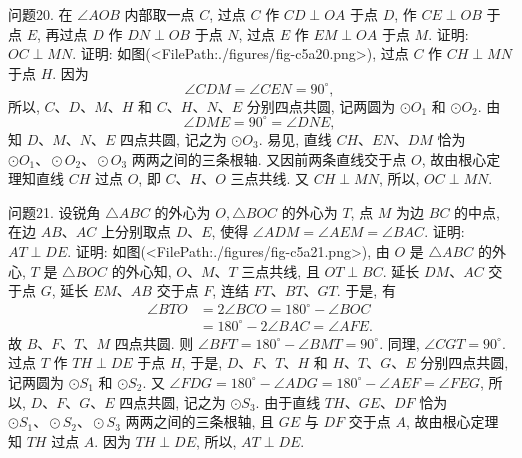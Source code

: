 问题20. 在 $\angle A O B$ 内部取一点 $C$, 过点 $C$ 作 $C D \perp O A$ 于点 $D$, 作 $C E \perp O B$ 于点 $E$, 再过点 $D$ 作 $D N \perp O B$ 于点 $N$, 过点 $E$ 作 $E M \perp O A$ 于点 $M$. 证明: $O C \perp M N$.
证明: 如图(<FilePath:./figures/fig-c5a20.png>), 过点 $C$ 作 $C H \perp M N$ 于点 $H$.
因为
$$
\angle C D M=\angle C E N=90^{\circ},
$$
所以, $C 、 D 、 M 、 H$ 和 $C 、 H 、 N 、 E$ 分别四点共圆, 记两圆为 $\odot O_1$ 和 $\odot O_2$. 由
$$
\angle D M E=90^{\circ}=\angle D N E,
$$
知 $D 、 M 、 N 、 E$ 四点共圆, 记之为 $\odot O_3$.
易见, 直线 $C H 、 E N 、 D M$ 恰为 $\odot O_1 、 \odot O_2 、 \odot O_3$ 两两之间的三条根轴.
又因前两条直线交于点 $O$, 故由根心定理知直线 $C H$ 过点 $O$, 即 $C 、 H 、 O$ 三点共线.
又 $C H \perp M N$, 所以, $O C \perp M N$.



问题21. 设锐角 $\triangle A B C$ 的外心为 $O, \triangle B O C$ 的外心为 $T$, 点 $M$ 为边 $B C$ 的中点, 在边 $A B 、 A C$ 上分别取点 $D 、 E$, 使得 $\angle A D M=\angle A E M=\angle B A C$. 证明: $A T \perp D E$.
证明: 如图(<FilePath:./figures/fig-c5a21.png>), 由 $O$ 是 $\triangle A B C$ 的外心, $T$ 是 $\triangle B O C$ 的外心知, $O 、 M 、 T$ 三点共线, 且 $O T \perp B C$.
延长 $D M 、 A C$ 交于点 $G$, 延长 $E M 、 A B$ 交于点 $F$, 连结 $F T 、 B T 、 G T$. 于是, 有
$$
\begin{aligned}
\angle B T O & =2 \angle B C O=180^{\circ}-\angle B O C \\
& =180^{\circ}-2 \angle B A C=\angle A F E .
\end{aligned}
$$
故 $B 、 F 、 T 、 M$ 四点共圆.
则 $\angle B F T=180^{\circ}-\angle B M T=90^{\circ}$.
同理, $\angle C G T=90^{\circ}$.
过点 $T$ 作 $T H \perp D E$ 于点 $H$, 于是, $D 、 F 、 T 、 H$ 和 $H 、 T 、 G 、 E$ 分别四点共圆, 记两圆为 $\odot S_1$ 和 $\odot S_2$.
又 $\angle F D G=180^{\circ}-\angle A D G=180^{\circ}-\angle A E F=\angle F E G$,
所以, $D 、 F 、 G 、 E$ 四点共圆, 记之为 $\odot S_3$.
由于直线 $T H 、 G E 、 D F$ 恰为 $\odot S_1 、 \odot S_2 、 \odot S_3$ 两两之间的三条根轴, 且 $G E$ 与 $D F$ 交于点 $A$, 故由根心定理知 $T H$ 过点 $A$.
因为 $T H \perp D E$, 所以, $A T \perp D E$.


